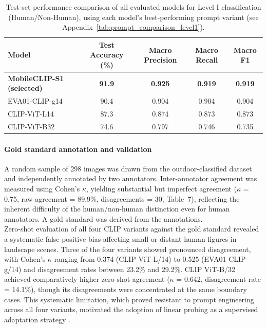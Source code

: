 \documentclass[hidelinks, 11pt]{article}
\begin{document}
\begin{table}[htbp]
\centering
\caption{Test-set performance comparison of all evaluated models for Level I classification (Human/Non-Human), using each model's best-performing prompt variant (see Appendix~\ref{tab:prompt_comparison_level1}).}
\label{tab:level1_final_comparison}
\begin{tabular}{@{}lcccc@{}}
\toprule
\textbf{Model} & \textbf{Test Accuracy (\%)} & \textbf{Macro Precision} & \textbf{Macro Recall} & \textbf{Macro F1} \\
\midrule
\textbf{MobileCLIP-S1 (selected)} & \textbf{91.9} & \textbf{0.925} & \textbf{0.919} & \textbf{0.919} \\
EVA01-CLIP-g14              & 90.4 & 0.904 & 0.904 & 0.904 \\
CLIP-ViT-L14                & 87.3 & 0.874 & 0.873 & 0.873 \\
CLIP-ViT-B32                & 74.6 & 0.797 & 0.746 & 0.735 \\
\bottomrule
\end{tabular}
\end{table}

\paragraph{Gold standard annotation and validation}
A random sample of 298 images was drawn from the outdoor-classified dataset and independently annotated by two annotators. Inter-annotator agreement was measured using Cohen's $\kappa$, yielding substantial but imperfect agreement ($\kappa$ = 0.75, raw agreement = 89.9\%, disagreements = 30, Table~7), reflecting the inherent difficulty of the human/non-human distinction even for human annotators. A gold standard was derived from the annotations.
\\
Zero-shot evaluation of all four CLIP variants against the gold standard revealed a systematic false-positive bias affecting small or distant human figures in landscape scenes. Three of the four variants showed pronounced disagreement, with Cohen's $\kappa$ ranging from 0.374 (CLIP ViT-L/14) to 0.525 (EVA01-CLIP-g/14) and disagreement rates between 23.2\% and 29.2\%.
CLIP ViT-B/32 achieved comparatively higher zero-shot agreement ($\kappa$ = 0.642, disagreement rate = 14.1\%), though its disagreements were concentrated at the same boundary cases. This systematic limitation, which proved resistant to prompt engineering across all four variants, motivated the adoption of linear probing as a supervised adaptation strategy
\citep{radford_learning_2021}.
\end{document}
